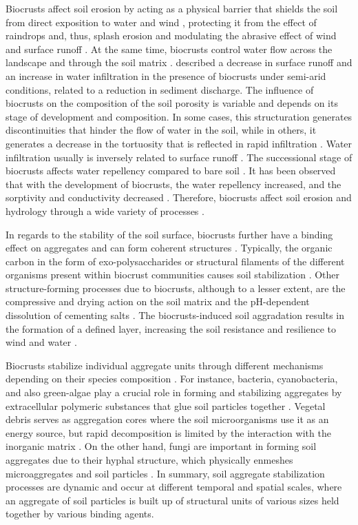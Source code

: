 Biocrusts affect soil erosion by acting as a physical barrier that shields the soil from direct exposition to water and wind \citep{Seitz2016}, protecting it from the effect of raindrops and, thus, splash erosion \citep{Seitz2017,Goebes2015} and modulating the abrasive effect of wind and surface runoff \citep{BelnapBudel2016}. At the same time, biocrusts control water flow across the landscape and through the soil matrix \citep{Thielen2021,Eldridge2020}. \citet{Eldridge2020} described a decrease in surface runoff and an increase in water infiltration in the presence of biocrusts under semi-arid conditions, related to a reduction in sediment discharge. The influence of biocrusts on the composition of the soil porosity is variable and depends on its stage of development and composition. In some cases, this structuration generates discontinuities that hinder the flow of water in the soil, while in others, it generates a decrease in the tortuosity that is reflected in rapid infiltration \citep{Fischer2013}. Water infiltration usually is inversely related to surface runoff \citep{Lichner2012}. The successional stage of biocrusts affects water repellency compared to bare soil \citep{Drahorad2013}. It has been observed that with the development of biocrusts, the water repellency increased, and the sorptivity and conductivity decreased \citep{Fischer2012,Lichner2012}. Therefore, biocrusts affect soil erosion and hydrology through a wide variety of processes \citep{BelnapBudel2016}.

In regards to the stability of the soil surface, biocrusts further have a binding effect on aggregates and can form coherent structures \citep{BelnapBudel2016}. Typically, the organic carbon in the form of exo-polysaccharides or structural filaments of the different organisms present within biocrust communities causes soil stabilization  \citep{GarciaPichel2016}. Other structure-forming processes due to biocrusts, although to a lesser extent, are the compressive and drying action on the soil matrix and the pH-dependent dissolution of cementing salts \citep{Bowker2016}. The biocrusts-induced soil aggradation results in the formation of a defined layer, increasing the soil resistance and resilience to wind and water \citep{Rosentreter2016}.

Biocrusts stabilize individual aggregate units through different mechanisms depending on their species composition \citep{GarciaPichel2016}. For instance, bacteria, cyanobacteria, and also green-algae play a crucial role in forming and stabilizing aggregates by extracellular polymeric substances that glue soil particles together \citep{Six2004,Lewin1956}. Vegetal debris serves as aggregation cores where the soil microorganisms use it as an energy source, but rapid decomposition is limited by the interaction with the inorganic matrix \citep{Oades1991}. On the other hand, fungi are important in forming soil aggregates due to their hyphal structure, which physically enmeshes microaggregates and soil particles \citep{Totsche2018}. In summary, soil aggregate stabilization processes are dynamic and occur at different temporal and spatial scales, where an aggregate of soil particles is built up of structural units of various sizes held together by various binding agents.

